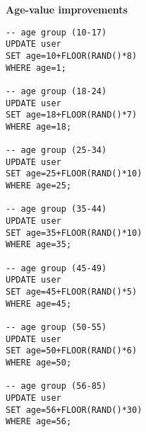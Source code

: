 \textbf{Age-value improvements}
\begin{lstlisting}
-- age group (10-17)
UPDATE user
SET age=10+FLOOR(RAND()*8)
WHERE age=1;

-- age group (18-24)
UPDATE user
SET age=18+FLOOR(RAND()*7)
WHERE age=18;

-- age group (25-34)
UPDATE user
SET age=25+FLOOR(RAND()*10)
WHERE age=25;

-- age group (35-44)
UPDATE user
SET age=35+FLOOR(RAND()*10)
WHERE age=35;

-- age group (45-49)
UPDATE user
SET age=45+FLOOR(RAND()*5)
WHERE age=45;

-- age group (50-55)
UPDATE user
SET age=50+FLOOR(RAND()*6)
WHERE age=50;

-- age group (56-85)
UPDATE user
SET age=56+FLOOR(RAND()*30)
WHERE age=56;
\end{lstlisting}